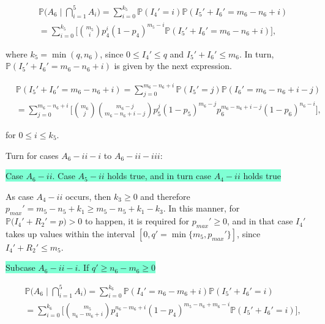 \documentclass[a4paper]{article}
\theoremstyle{remark}
\begin{document}
\begin{equation*}
\begin{split}
&\mathbb{P}\bigg(A_{6}\mid \bigcap_{i=1}^{5}A_{i}\bigg)=\sum_{i=0}^{k_5} \mathbb{P}(I_{4}'=i)\mathbb{P}(I_{5}'+I_{6}'=m_6-n_6+i)\\
&=\sum_{i=0}^{k_5} \Bigg[{m_5 \choose i}p_4^{i}(1-p_4)^{m_5-i}\mathbb{P}(I_{5}'+I_{6}'=m_6-n_6+i)\Bigg],
\end{split}
\end{equation*}


where $k_5=\min(q,n_6)$, since $0\leq I_{4}'\leq q$ and $I_{5}'+I_{6}'\leq m_6$. In turn, $\mathbb{P}(I_{5}'+I_{6}'=m_6-n_6+i)$ is given by the next expression.

\begin{equation*}
\begin{split}
&\mathbb{P}(I_{5}'+I_{6}'=m_6-n_6+i)=\sum_{j=0}^{m_6-n_6+i} \mathbb{P}(I_{5}'=j)\mathbb{P}(I_{6}'=m_6-n_6+i-j)\\
&=\sum_{j=0}^{m_6-n_6+i}\Bigg[{m_6 \choose j}{m_6-j \choose m_6-n_6+i-j}p_5^{j}(1-p_5)^{m_6-j}p_6^{m_6-n_6+i-j}(1-p_6)^{n_6-i}\Bigg],
\end{split}
\end{equation*}

for $0\leq i\leq k_5$.

\medskip

Turn for cases $A_6-ii-i$ to $A_6-ii-iii$: 

\colorbox{Aquamarine}{Case $A_6-ii$. Case $A_5-ii$ holds true, and in turn case $A_4-ii$ holds true}%

As case $A_4-ii$ occurs, then $k_3\geq 0$ and therefore  $p_{max}'=m_5-n_5+k_1\geq m_5-n_5+k_1-k_3$. In this manner, for $\mathbb{P}\big(I_{4}'+R_{2}'=p\big)>0$ to happen, it is required for $p_{max}'\geq 0$, and in that case $I_4'$ takes up values within the interval $[0,q'=\min\{m_5, p_{max}'\}]$, since $I_{4}'+R_{2}'\leq m_5$.

\medskip
\colorbox{Aquamarine}{Subcase $A_6-ii-i$. If $q'\geq n_6-m_6\geq 0$}

\begin{equation*}
\begin{split}
&\mathbb{P}\bigg(A_{6}\mid \bigcap_{i=1}^{5}A_{i}\bigg)=\sum_{i=0}^{k_6} \mathbb{P}(I_{4}'=n_6-m_6+i)\mathbb{P}(I_{5}'+I_{6}'=i)\\
&=\sum_{i=0}^{k_6} \Bigg[{m_5 \choose n_6-m_6+i}p_4^{n_6-m_6+i}(1-p_4)^{m_5-n_6+m_6-i}\mathbb{P}(I_{5}'+I_{6}'=i)\Bigg],
\end{split}
\end{equation*}
\end{document}
